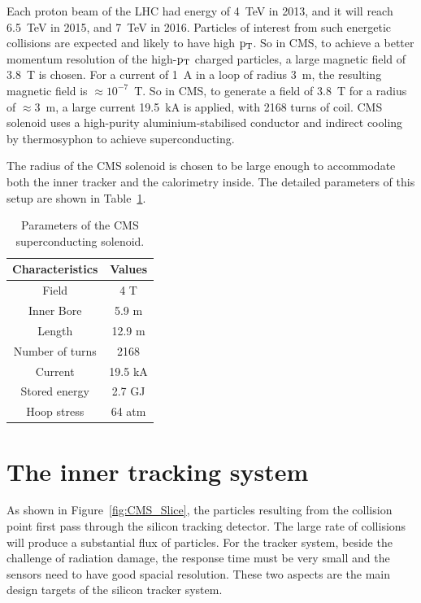 Each proton beam of the LHC had energy of 4~TeV in 2013, and it will reach 6.5~TeV in 2015, and 7~TeV in 2016. 
Particles of interest from such energetic collisions are expected and likely to have high $\mathrm{p_{T}}$. 
So in CMS, 
to achieve a better momentum resolution of the high-$\mathrm{p_{T}}$ charged particles, a large magnetic field of 3.8~T is chosen. 
For a current of 1~A in a loop of radius 3~m, the 
resulting magnetic field is ${\approx}10^{-7}$~T. So in CMS, to generate a field of 3.8~T for a radius of 
${\approx}3$~m, a large current 19.5~kA is applied, with 2168 turns of coil. CMS solenoid uses a high-purity aluminium-stabilised conductor and indirect cooling by thermosyphon to achieve superconducting. 

The radius of the CMS solenoid is chosen to be large enough to accommodate both the inner tracker and the calorimetry inside. The detailed parameters of this setup are shown in Table~\ref{table:magnet}.  

\begin{table}[!htb]
\setlength{\tabcolsep}{12pt}
\caption{Parameters of the CMS superconducting solenoid.}
\begin{center}
\begin{tabular}{ cc }
Characteristics & Values \\
\hline
Field           &  4 T \\
Inner Bore  &  5.9 m \\
Length        &  12.9 m \\
Number of turns &  2168 \\
Current   &        19.5 kA  \\
Stored energy &  2.7 GJ \\
Hoop stress   &   64 atm \\
\hline
\end{tabular} 
\end{center}
\label{table:magnet}
\end{table}

\section{The inner tracking system}

As shown in Figure~\ref{fig:CMS_Slice}, the particles resulting from the collision point first pass through the silicon tracking detector. The large rate of collisions will produce a substantial flux of particles. For the tracker system, beside the challenge of radiation damage, the response time must be very small and the sensors need to have good spacial resolution. 
These two 
aspects are the main design targets of the silicon tracker system. 

